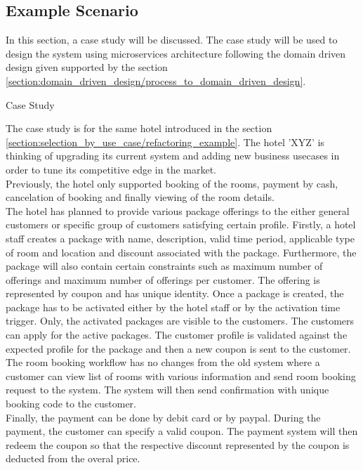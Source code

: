 \subsection{Example Scenario}\label{section:domain_driven_design/example_scenario}
In this section, a case study will be discussed. The case study will be used to design the system using microservices architecture following the domain driven design given supported by the section \ref{section:domain_driven_design/process_to_domain_driven_design}.

\begin{shaded} Case Study \end{shaded} \label{section:domain_driven_design/example_scenario/case_study}
The case study is for the same hotel introduced in the section \ref{section:selection_by_use_case/refactoring_example}. The hotel 'XYZ' is thinking of upgrading its current system and adding new business usecases in order to tune its competitive edge in the market.\\
Previously, the hotel only supported booking of the rooms, payment by cash, cancelation of booking and finally viewing of the room details.\\
The hotel has planned to provide various package offerings to the either general customers or specific group of customers satisfying certain profile. Firstly, a hotel staff creates a package with name, description, valid time period, applicable type of room and location and discount associated with the package. Furthermore, the package will also contain certain constraints such as maximum number of offerings and maximum number of offerings per customer. The offering is represented by coupon and has unique identity. Once a package is created, the package has to be activated either by the hotel staff or by the activation time trigger. Only, the activated packages are visible to the customers. The customers can apply for the active packages. The customer profile is validated against the expected profile for the package and then a new coupon is sent to the customer.\\
The room booking workflow has no changes from the old system where a customer can view list of rooms with various information and send room booking request to the system. The system will then send confirmation with unique booking code to the customer.\\
Finally, the payment can be done by debit card or by paypal. During the payment, the customer can specify a valid coupon. The payment system will then redeem the coupon so that the respective discount represented by the coupon is deducted from the overal price.\\

